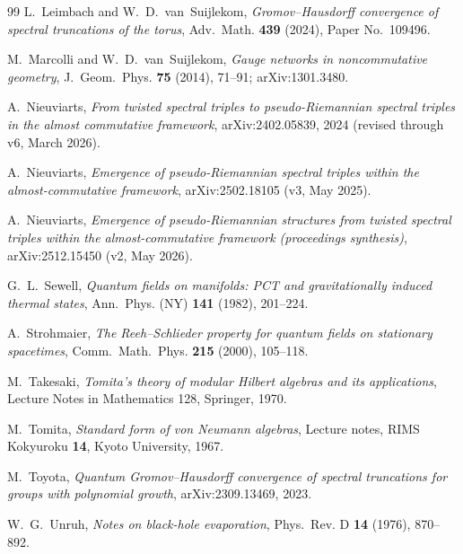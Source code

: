 \documentclass[11pt,a4paper]{article}
\theoremstyle{plain}
\theoremstyle{definition}
\begin{document}
\begin{thebibliography}{99}
L.~Leimbach and W.~D.~van~Suijlekom,
\newblock \emph{Gromov--Hausdorff convergence of spectral truncations
of the torus},
\newblock Adv.~Math. \textbf{439} (2024), Paper No.~109496.

M.~Marcolli and W.~D.~van~Suijlekom,
\newblock \emph{Gauge networks in noncommutative geometry},
\newblock J.~Geom.~Phys. \textbf{75} (2014), 71--91;
\newblock arXiv:1301.3480.

A.~Nieuviarts,
\newblock \emph{From twisted spectral triples to pseudo-Riemannian
spectral triples in the almost commutative framework},
\newblock arXiv:2402.05839, 2024 (revised through v6, March 2026).

A.~Nieuviarts,
\newblock \emph{Emergence of pseudo-Riemannian spectral triples
within the almost-commutative framework},
\newblock arXiv:2502.18105 (v3, May 2025).

A.~Nieuviarts,
\newblock \emph{Emergence of pseudo-Riemannian structures from
twisted spectral triples within the almost-commutative framework
(proceedings synthesis)},
\newblock arXiv:2512.15450 (v2, May 2026).

G.~L.~Sewell,
\newblock \emph{Quantum fields on manifolds: PCT and gravitationally
induced thermal states},
\newblock Ann.~Phys. (NY) \textbf{141} (1982), 201--224.

A.~Strohmaier,
\newblock \emph{The Reeh--Schlieder property for quantum fields on
stationary spacetimes},
\newblock Comm.~Math.~Phys. \textbf{215} (2000), 105--118.

M.~Takesaki,
\newblock \emph{Tomita's theory of modular Hilbert algebras and its
applications},
\newblock Lecture Notes in Mathematics 128, Springer, 1970.

M.~Tomita,
\newblock \emph{Standard form of von Neumann algebras},
\newblock Lecture notes, RIMS Kokyuroku \textbf{14}, Kyoto University,
1967.

M.~Toyota,
\newblock \emph{Quantum Gromov--Hausdorff convergence of spectral
truncations for groups with polynomial growth},
\newblock arXiv:2309.13469, 2023.

W.~G.~Unruh,
\newblock \emph{Notes on black-hole evaporation},
\newblock Phys.~Rev. D \textbf{14} (1976), 870--892.


\end{thebibliography}
\end{document}

